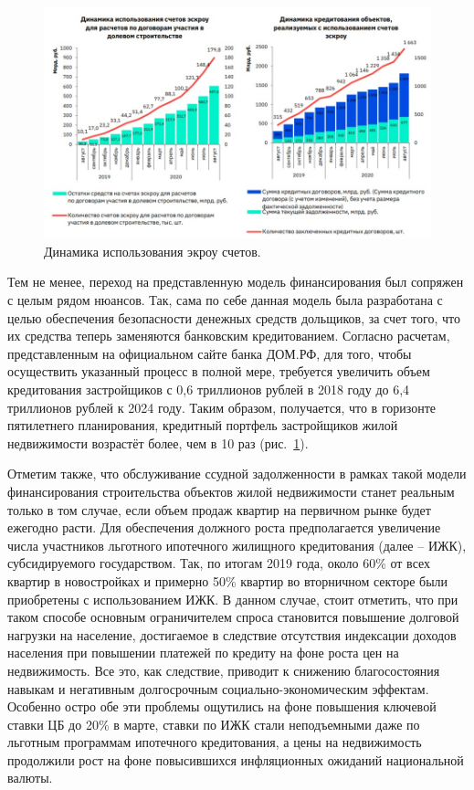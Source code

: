 \documentclass[12pt,a4paper]{article} %
\begin{document}
\begin{figure}[h]
	
	\centering
	
	\includegraphics[width=0.7\linewidth]{eskrou_dynam.jpg}
	
	\caption{Динамика использования экроу счетов.}
	
	\label{fig:eskrou_dynam}
	
\end{figure}

Тем не менее, переход на представленную модель финансирования был сопряжен с целым рядом нюансов. Так, сама по себе данная модель была разработана с целью обеспечения безопасности денежных средств дольщиков, за счет того, что их средства теперь заменяются банковским кредитованием. Согласно расчетам, представленным на официальном сайте банка ДОМ.РФ\cite{domrf}, для того, чтобы осуществить указанный процесс в полной мере, требуется увеличить объем кредитования застройщиков с 0,6 триллионов рублей в 2018 году до 6,4 триллионов рублей к 2024 году. Таким образом, получается, что в горизонте пятилетнего планирования, кредитный портфель застройщиков жилой недвижимости возрастёт более, чем в 10 раз (рис.~\ref{fig:eskrou_dynam}).

Отметим также, что обслуживание ссудной задолженности в рамках такой модели финансирования строительства объектов жилой недвижимости станет реальным только в том случае, если объем продаж квартир на первичном рынке будет ежегодно расти.  Для обеспечения должного роста предполагается увеличение числа участников льготного ипотечного жилищного кредитования (далее – ИЖК), субсидируемого государством. Так, по итогам 2019 года, около 60\% от всех квартир в новостройках и примерно 50\% квартир во вторничном секторе были приобретены с использованием ИЖК\cite{Asso}. В данном случае, стоит отметить, что при таком способе основным ограничителем спроса становится повышение долговой нагрузки на население, достигаемое в следствие отсутствия индексации доходов населения при повышении платежей по кредиту на фоне роста цен на недвижимость. Все это, как следствие, приводит к снижению благосостояния навыкам и негативным долгосрочным социально-экономическим эффектам. Особенно остро обе эти проблемы ощутились на фоне повышения ключевой ставки ЦБ до 20\% в марте, ставки по ИЖК стали неподъемными даже по льготным программам ипотечного кредитования, а цены на недвижимость продолжили рост на фоне повысившихся инфляционных ожиданий национальной валюты.
\end{document}
